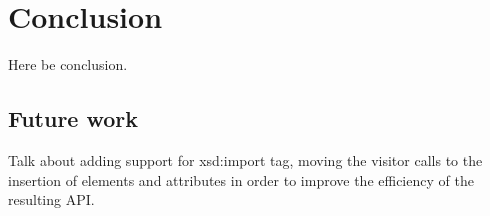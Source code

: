 \chapter{Conclusion}
\label{cha:conclusion}

Here be conclusion.

\section{Future work}
\label{cha:futurework}

Talk about adding support for xsd:import tag, moving the visitor calls to the insertion of elements and attributes in order to improve the efficiency of the resulting API.